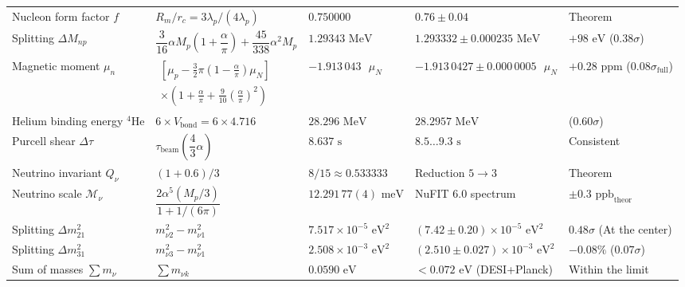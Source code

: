 \documentclass[11pt,a4paper]{article}
\theoremstyle{definition}
\theoremstyle{remark}
\begin{document}
\begin{xltabular}{\textwidth}{
>{\raggedright\arraybackslash}p{3.8cm}
>{\centering\arraybackslash}X
>{\centering\arraybackslash}p{2.7cm}
>{\centering\arraybackslash}p{2.8cm}
>{\centering\arraybackslash}p{2.0cm}
}
Nucleon form factor $f$ & $R_m / r_c = 3\lambda_p / (4\lambda_p)$ & $0.750000$ & $0.76 \pm 0.04$ & Theorem \\

Splitting $\Delta M_{np}$ & $\dfrac{3}{16}\alpha M_p \left(1 + \dfrac{\alpha}{\pi}\right) + \dfrac{45}{338}\alpha^2 M_p$ & $1.29343\text{ MeV}$ & $1.293332 \pm 0.000235\text{ MeV}$ & $+98\text{ eV}$ ($0.38\sigma$) \\

Magnetic moment $\mu_n$ & $\begin{gathered} \left[\mu_p - \tfrac{3}{2}\pi\left(1 - \tfrac{\alpha}{\pi}\right)\mu_N\right] \\ \times \left(1 + \tfrac{\alpha}{\pi} + \tfrac{9}{10}\left(\tfrac{\alpha}{\pi}\right)^2\right) \end{gathered}$ & $-1.913\,043\text{ }\mu_N$ & $-1.913\,0427 \pm 0.000\,0005\text{ }\mu_N$ & $+0.28\text{ ppm}$ ($0.08\sigma_{\mathrm{full}}$) \\

Helium binding energy $^4\mathrm{He}$ & $6 \times V_{\mathrm{bond}} = 6 \times 4.716$ & $28.296\text{ MeV}$ & $28.2957\text{ MeV}$ & ($0.60\sigma$) \\

Purcell shear $\Delta\tau$ & $\tau_{\mathrm{beam}}\left(\dfrac{4}{3}\alpha\right)$ & $8.637\text{ s}$ & $8.5\dots 9.3\text{ s}$ & Consistent \\

Neutrino invariant $Q_\nu$ & $(1 + 0.6) / 3$ & $8/15 \approx 0.533333$ & Reduction $5 \to 3$ & Theorem \\

Neutrino scale $\mathcal{M}_\nu$ & $\dfrac{2\alpha^5(M_p/3)}{1 + 1/(6\pi)}$ & $12.291\,77(4)\text{ meV}$ & NuFIT 6.0 spectrum & $\pm 0.3\text{ ppb}_{\mathrm{theor}}$ \\

Splitting $\Delta m_{21}^2$ & $m_{\nu 2}^2 - m_{\nu 1}^2$ & $7.517 \times 10^{-5}\text{ eV}^2$ & $(7.42 \pm 0.20)\times 10^{-5}\text{ eV}^2$ & $0.48\sigma$ (At the center) \\

Splitting $\Delta m_{31}^2$ & $m_{\nu 3}^2 - m_{\nu 1}^2$ & $2.508 \times 10^{-3}\text{ eV}^2$ & $(2.510 \pm 0.027)\times 10^{-3}\text{ eV}^2$ & $-0.08\%$ ($0.07\sigma$) \\

Sum of masses $\sum m_\nu$ & $\sum m_{\nu k}$ & $0.0590\text{ eV}$ & $< 0.072\text{ eV}$ (DESI+Planck) & Within the limit \\


\end{xltabular}
\end{document}
